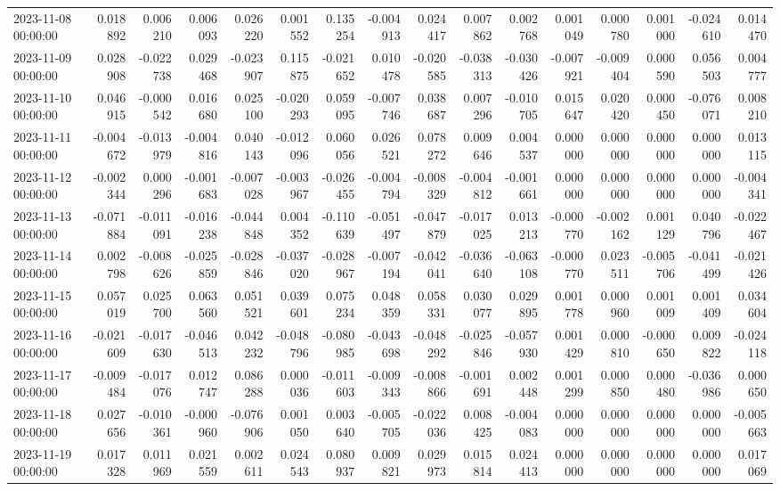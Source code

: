 \begin{tabular}{lrrrrrrrrrrrrrrr}
2023-11-08 00:00:00 & 0.018892 & 0.006210 & 0.006093 & 0.026220 & 0.001552 & 0.135254 & -0.004913 & 0.024417 & 0.007862 & 0.002768 & 0.001049 & 0.000780 & 0.001000 & -0.024610 & 0.014470 \\
2023-11-09 00:00:00 & 0.028908 & -0.022738 & 0.029468 & -0.023907 & 0.115875 & -0.021652 & 0.010478 & -0.020585 & -0.038313 & -0.030426 & -0.007921 & -0.009404 & 0.000590 & 0.056503 & 0.004777 \\
2023-11-10 00:00:00 & 0.046915 & -0.000542 & 0.016680 & 0.025100 & -0.020293 & 0.059095 & -0.007746 & 0.038687 & 0.007296 & -0.010705 & 0.015647 & 0.020420 & 0.000450 & -0.076071 & 0.008210 \\
2023-11-11 00:00:00 & -0.004672 & -0.013979 & -0.004816 & 0.040143 & -0.012096 & 0.060056 & 0.026521 & 0.078272 & 0.009646 & 0.004537 & 0.000000 & 0.000000 & 0.000000 & 0.000000 & 0.013115 \\
2023-11-12 00:00:00 & -0.002344 & 0.000296 & -0.001683 & -0.007028 & -0.003967 & -0.026455 & -0.004794 & -0.008329 & -0.004812 & -0.001661 & 0.000000 & 0.000000 & 0.000000 & 0.000000 & -0.004341 \\
2023-11-13 00:00:00 & -0.071884 & -0.011091 & -0.016238 & -0.044848 & 0.004352 & -0.110639 & -0.051497 & -0.047879 & -0.017025 & 0.013213 & -0.000770 & -0.002162 & 0.001129 & 0.040796 & -0.022467 \\
2023-11-14 00:00:00 & 0.002798 & -0.008626 & -0.025859 & -0.028846 & -0.037020 & -0.028967 & -0.007194 & -0.042041 & -0.036640 & -0.063108 & -0.000770 & 0.023511 & -0.005706 & -0.041499 & -0.021426 \\
2023-11-15 00:00:00 & 0.057019 & 0.025700 & 0.063560 & 0.051521 & 0.039601 & 0.075234 & 0.048359 & 0.058331 & 0.030077 & 0.029895 & 0.001778 & 0.000960 & 0.001009 & 0.001409 & 0.034604 \\
2023-11-16 00:00:00 & -0.021609 & -0.017630 & -0.046513 & 0.042232 & -0.048796 & -0.080985 & -0.043698 & -0.048292 & -0.025846 & -0.057930 & 0.001429 & 0.000810 & -0.000650 & 0.009822 & -0.024118 \\
2023-11-17 00:00:00 & -0.009484 & -0.017076 & 0.012747 & 0.086288 & 0.000036 & -0.011603 & -0.009343 & -0.008866 & -0.001691 & 0.002448 & 0.001299 & 0.000850 & 0.000480 & -0.036986 & 0.000650 \\
2023-11-18 00:00:00 & 0.027656 & -0.010361 & -0.000960 & -0.076906 & 0.001050 & 0.003640 & -0.005705 & -0.022036 & 0.008425 & -0.004083 & 0.000000 & 0.000000 & 0.000000 & 0.000000 & -0.005663 \\
2023-11-19 00:00:00 & 0.017328 & 0.011969 & 0.021559 & 0.002611 & 0.024543 & 0.080937 & 0.009821 & 0.029973 & 0.015814 & 0.024413 & 0.000000 & 0.000000 & 0.000000 & 0.000000 & 0.017069 \\

\end{tabular}
